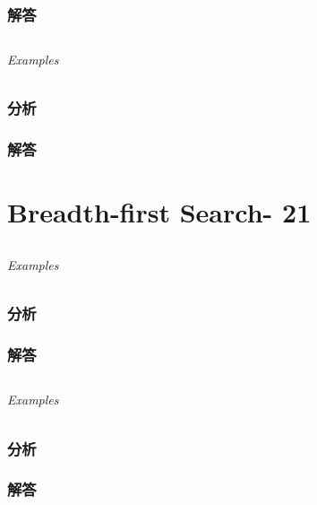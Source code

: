 \documentclass[UTF8,a4paper,12pt]{ctexbook}
\begin{document}
	\subsection{解答}
	
\section{}
	
	\subparagraph{Examples}
	
	\subsection{分析}
	
	\subsection{解答}
\chapter{Breadth-first Search- 21}
\section{}
	
	\subparagraph{Examples}
	
	\subsection{分析}
	
	\subsection{解答}
	
\section{}
	
	\subparagraph{Examples}
	
	\subsection{分析}
	
	\subsection{解答}
	
\section{}
	
\end{document}
